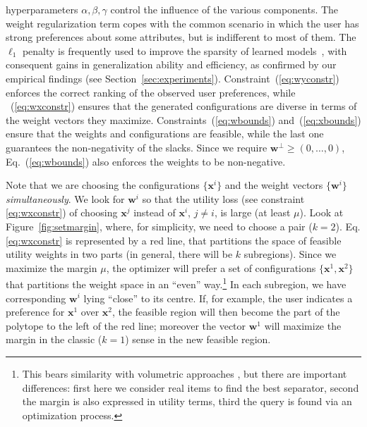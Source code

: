 \documentclass{article}
\renewcommand\[{\begin{equation}}
\renewcommand\]{\end{equation}}
\newcommand{\vecvar}[1]{\ensuremath{\boldsymbol{#1}}}
\newcommand{\vw}{\vecvar{w}}
\newcommand{\vx}{\vecvar{x}}
\newcommand{\stefano}[1]{{\bf \textcolor{green}{{\fbox{Stefano:} #1}}}}
\newcommand{\paolo}[1]{{\bf \textcolor{red}{{\fbox{Paolo:} #1}}}}
\begin{document}
hyperparameters $\alpha,\beta,\gamma$ control the influence of the
various components. The weight regularization term copes with the
common scenario in which the user has strong preferences about some
attributes, but is indifferent to most of
them. %
The $\ell_1$ penalty is frequently used to improve the sparsity of
learned models~\cite{lasso,zhang2008,Hensinger2010}, with consequent
gains in generalization ability and efficiency, as confirmed by our
empirical findings (see
Section~\ref{sec:experiments}). Constraint~(\ref{eq:wyconstr})
enforces the correct ranking of the observed user preferences, while
~(\ref{eq:wxconstr}) ensures that the generated
configurations are diverse in terms of the weight vectors they
maximize. Constraints~(\ref{eq:wbounds}) and~(\ref{eq:xbounds}) ensure
that the weights and configurations are feasible, while the last one
guarantees the non-negativity of the slacks.  Since we require
$\vw^\bot \ge (0,\ldots,0)$, Eq.~(\ref{eq:wbounds}) also enforces the
weights to be non-negative.

Note that we are choosing the configurations $\{ \vx^i \}$ and the
weight vectors $\{ \vw^i \}$ {\em simultaneously}.  
We look for $\vw^i$ so that the utility loss (see constraint \ref{eq:wxconstr}) of choosing $\vx^{j}$ instead of $\vx^{i}$, $j \neq i$, is large (at least $\mu$).
Look at
Figure~\ref{fig:setmargin}, where, for simplicity, we need to choose a
pair ($k=2$).  Eq. \ref{eq:wxconstr} is represented by a
red line, that partitions the space of feasible utility weights in two
parts (in general, there will be $k$ subregions).  Since we maximize
the margin $\mu$, the optimizer will prefer a set of configurations
$\{ \vx^{1}, \vx^{2} \}$ that partitions the weight space in an ``even''
way.\footnote{This bears similarity with volumetric approaches \cite{iyengar:acm-ec01}, but there are important differences: first here
we consider real items to find the best separator, second the margin is also expressed in utility terms, third the query is found via an optimization process.}
In each subregion, we have corresponding %
$\vw^{i}$ lying ``close'' to its centre. 
If, for example, the user indicates a
preference for $\vx^{1}$ over $\vx^{2}$, the feasible region %
will then become the part of the polytope to the left of the
red line; moreover the vector $\vw^{1}$ will maximize the margin in the classic ($k=1$) sense in the new feasible region.
\end{document}
